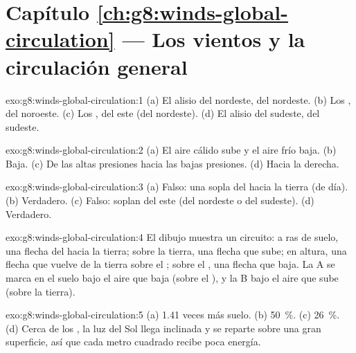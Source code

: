 \section*{Capítulo \ref{ch:g8:winds-global-circulation} --- Los vientos y la circulación general}

\begin{solution}{exo:g8:winds-global-circulation:1}
(a) El alisio del nordeste, del nordeste. (b) Los , del
noroeste. (c) Los , del este (del nordeste).
(d) El alisio del sudeste, del sudeste.
\end{solution}

\begin{solution}{exo:g8:winds-global-circulation:2}
(a) El aire cálido sube y el aire frío baja. (b) Baja. (c) De las altas
presiones hacia las bajas presiones. (d) Hacia la derecha.
\end{solution}

\begin{solution}{exo:g8:winds-global-circulation:3}
(a) Falso: una  sopla del  hacia la tierra (de día).
(b) Verdadero. (c) Falso: soplan del este (del nordeste o del sudeste).
(d) Verdadero.
\end{solution}

\begin{solution}{exo:g8:winds-global-circulation:4}
El dibujo muestra un circuito: a ras de suelo, una flecha del  hacia la
tierra; sobre la tierra, una flecha que sube; en altura, una flecha que
vuelve de la tierra sobre el ; sobre el , una flecha que baja. La A
se marca en el suelo bajo el aire que baja (sobre el ), y la B bajo el
aire que sube (sobre la tierra).
\end{solution}

\begin{solution}{exo:g8:winds-global-circulation:5}
(a) 1.41 veces más suelo. (b) 50~\%. (c) 26~\%. (d) Cerca de los , la
luz del Sol llega inclinada y se reparte sobre una gran superficie, así que
cada metro cuadrado recibe poca energía.
\end{solution}

